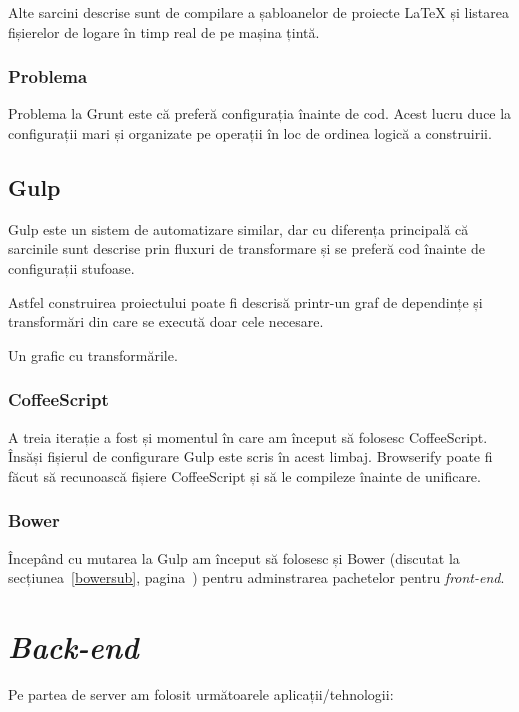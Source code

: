 \documentclass[a4wide,12pt]{report}
\newcommand{\eng}[1]{\emph{#1}} %
\newcommand{\idee}[1]{{\color{red} #1}}
\begin{document}
Alte sarcini descrise sunt de compilare a șabloanelor de proiecte \LaTeX{} și
listarea fișierelor de logare în timp real de pe mașina țintă.

\subsubsection{Problema}

Problema la Grunt este că preferă configurația înainte de cod. Acest lucru duce
la configurații mari și organizate pe operații în loc de ordinea logică a
construirii.

\subsection{Gulp}

Gulp este un sistem de automatizare similar, dar cu diferența principală că
sarcinile sunt descrise prin fluxuri de transformare și se preferă cod înainte
de configurații stufoase.

Astfel construirea proiectului poate fi descrisă printr-un graf de dependințe și
transformări din care se execută doar cele necesare.

\idee{Un grafic cu transformările.}

\subsubsection{CoffeeScript}

A treia iterație a fost și momentul în care am început să folosesc CoffeeScript.
Însăși fișierul de configurare Gulp este scris în acest limbaj. Browserify poate
fi făcut să recunoască fișiere CoffeeScript și să le compileze înainte de
unificare.

\subsubsection{Bower}

Începând cu mutarea la Gulp am început să folosesc și Bower (discutat la
secțiunea~\ref{bowersub}, pagina~\pageref{bowersub}) pentru adminstrarea
pachetelor pentru \eng{front-end}.

\section{\eng{Back-end}}

Pe partea de server am folosit următoarele aplicații/tehnologii:
\end{document}
